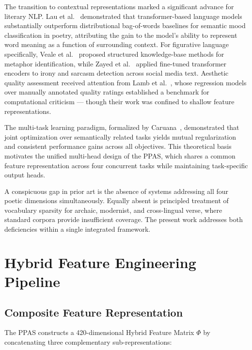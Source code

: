 \documentclass[conference]{IEEEtran}
\begin{document}
The transition to contextual representations marked a significant advance
for literary NLP. Lau et al.~\cite{lau2018} demonstrated that
transformer-based language models substantially outperform distributional
bag-of-words baselines for semantic mood classification in poetry,
attributing the gain to the model's ability to represent word meaning as
a function of surrounding context. For figurative language specifically,
Veale et al.~\cite{veale2016} proposed structured knowledge-base methods
for metaphor identification, while Zayed et al.~\cite{zayed2019} applied
fine-tuned transformer encoders to irony and sarcasm detection across
social media text. Aesthetic quality assessment received attention from
Lamb et al.~\cite{lamb2018}, whose regression models over manually
annotated quality ratings established a benchmark for computational
criticism --- though their work was confined to shallow feature
representations.

The multi-task learning paradigm, formalized by Caruana~\cite{caruana1997},
demonstrated that joint optimization over semantically related tasks
yields mutual regularization and consistent performance gains across all
objectives. This theoretical basis motivates the unified multi-head
design of the PPAS, which shares a common feature representation across
four concurrent tasks while maintaining task-specific output heads.

A conspicuous gap in prior art is the absence of systems addressing all
four poetic dimensions simultaneously. Equally absent is principled
treatment of vocabulary sparsity for archaic, modernist, and
cross-lingual verse, where standard corpora provide insufficient
coverage. The present work addresses both deficiencies within a single
integrated framework.

\section{Hybrid Feature Engineering Pipeline}
\label{sec:features}

\subsection{Composite Feature Representation}

The PPAS constructs a 420-dimensional Hybrid Feature Matrix $\Phi$ by
concatenating three complementary sub-representations:
\end{document}
